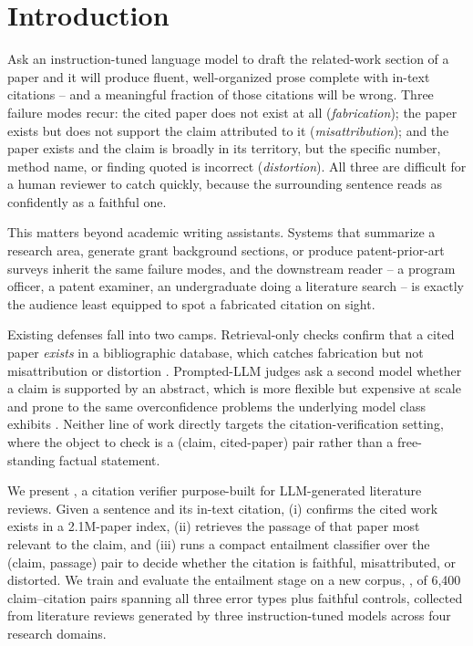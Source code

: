 \section{Introduction}

Ask an instruction-tuned language model to draft the related-work section of
a paper and it will produce fluent, well-organized prose complete with
in-text citations -- and a meaningful fraction of those citations will be
wrong. Three failure modes recur: the cited paper does not exist at all
(\emph{fabrication}); the paper exists but does not support the claim
attributed to it (\emph{misattribution}); and the paper exists and the claim
is broadly in its territory, but the specific number, method name, or
finding quoted is incorrect (\emph{distortion}). All three are difficult for
a human reviewer to catch quickly, because the surrounding sentence reads as
confidently as a faithful one.

This matters beyond academic writing assistants. Systems that summarize a
research area, generate grant background sections, or produce
patent-prior-art surveys inherit the same failure modes, and the downstream
reader -- a program officer, a patent examiner, an undergraduate doing a
literature search -- is exactly the audience least equipped to spot a
fabricated citation on sight.

Existing defenses fall into two camps. Retrieval-only checks confirm that a
cited paper \emph{exists} in a bibliographic database, which catches
fabrication but not misattribution or distortion \citep{oyelaran2022lowresource}.
Prompted-LLM judges ask a second model whether a claim is supported by an
abstract, which is more flexible but expensive at scale and prone to the
same overconfidence problems the underlying model class exhibits
\citep{nakamura2021survey}. Neither line of work directly targets the
citation-verification setting, where the object to check is a
(claim, cited-paper) pair rather than a free-standing factual statement.

We present , a citation verifier purpose-built for
LLM-generated literature reviews. Given a sentence and its in-text citation,
 (i) confirms the cited work exists in a 2.1M-paper index,
(ii) retrieves the passage of that paper most relevant to the claim, and
(iii) runs a compact entailment classifier over the (claim, passage) pair to
decide whether the citation is faithful, misattributed, or distorted. We
train and evaluate the entailment stage on a new corpus, ,
of 6,400 claim--citation pairs spanning all three error types plus faithful
controls, collected from literature reviews generated by three
instruction-tuned models across four research domains.

